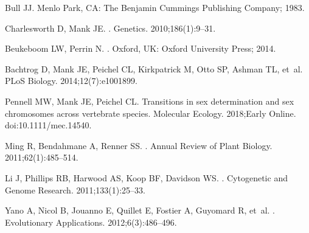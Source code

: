 \documentclass[10pt,letterpaper]{article}
\begin{document}
\nolinenumbers

%
%

\begin{thebibliography}{100}

Bull JJ.
\newblock Menlo Park, CA: The Benjamin Cummings Publishing Company; 1983.

Charlesworth D, Mank JE.
.
\newblock Genetics. 2010;186(1):9--31.

Beukeboom LW, Perrin N.
.
\newblock Oxford, UK: Oxford University Press; 2014.

Bachtrog D, Mank JE, Peichel CL, Kirkpatrick M, Otto SP, Ashman TL, et~al.
\newblock PLoS Biology. 2014;12(7):e1001899.

Pennell MW, Mank JE, Peichel CL.
\newblock Transitions in sex determination and sex chromosomes across
  vertebrate species.
\newblock Molecular Ecology. 2018;Early Online.
\newblock doi:{10.1111/mec.14540}.

Ming R, Bendahmane A, Renner SS.
.
\newblock Annual Review of Plant Biology. 2011;62(1):485--514.

Li J, Phillips RB, Harwood AS, Koop BF, Davidson WS.
.
\newblock Cytogenetic and Genome Research. 2011;133(1):25--33.

Yano A, Nicol B, Jouanno E, Quillet E, Fostier A, Guyomard R, et~al.
.
\newblock Evolutionary Applications. 2012;6(3):486--496.


\end{thebibliography}
\end{document}
